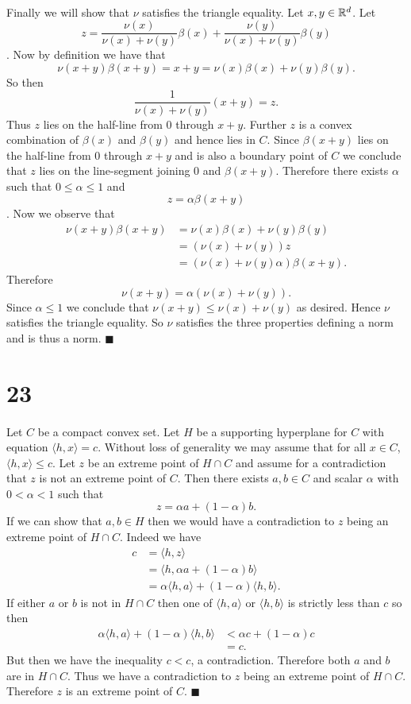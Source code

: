 \documentclass[letterpaper,12pt,oneside,onecolumn]{article}
\begin{document}
\paragraph{}
Finally we will show that $\nu$ satisfies the triangle equality. Let $x,y\in \mathbb{R}^d$. Let $$z = \frac{\nu(x)}{\nu(x)+ \nu(y)} \beta(x) + \frac{\nu(y)}{\nu(x) + \nu(y)} \beta(y)$$. Now by definition we have that
$$\nu(x+y) \beta(x+y) = x+y = \nu(x) \beta(x) + \nu(y) \beta(y).$$
So then $$\frac{1}{\nu(x) + \nu(y)}(x+y) = z.$$
Thus $z$ lies on the half-line from $0$ through $x+y$. Further $z$ is a convex combination of $\beta(x)$ and $\beta(y)$ and hence lies in $C$. Since $\beta(x+y)$ lies on the half-line from $0$ through $x+y$ and is also a boundary point of $C$ we conclude that $z$ lies on the line-segment joining $0$ and $\beta(x+y)$. Therefore there exists $\alpha$ such that $0\leq \alpha\leq 1$ and $$z = \alpha \beta(x+y)$$.
Now we observe that
\begin{align*}
\nu(x+y) \beta(x+y) &= \nu(x) \beta(x) + \nu(y)\beta(y)\\
 &= (\nu(x) + \nu(y))z \\
&= (\nu(x) + \nu(y)\alpha) \beta(x+y).
\end{align*}
Therefore
$$\nu(x+y) = \alpha(\nu(x) + \nu(y)).$$
Since $\alpha \leq 1$ we conclude that $\nu(x+y) \leq \nu(x) + \nu(y)$ as desired. Hence $\nu$ satisfies the triangle equality. So $\nu$ satisfies the three properties defining a norm and is thus a norm. $\blacksquare$
\section*{23}
\paragraph{}
Let $C$ be a compact convex set. Let $H$ be a supporting hyperplane for $C$ with equation $\langle h,x \rangle = c$. Without loss of generality we may assume that for all $x \in C$, $\langle h,x \rangle \leq c$. Let $z$ be an extreme point of $H\cap C$ and assume for a contradiction that $z$ is not an extreme point of $C$. Then there exists $a,b \in C$ and scalar $\alpha$ with $0<\alpha<1$ such that $$z = \alpha a + (1-\alpha)b.$$
If we can show that $a,b \in H$ then we would have a contradiction to $z$ being an extreme point of $H\cap C$. Indeed we have
\begin{align*}
c &= \langle h,z \rangle \\
&= \langle h, \alpha a + (1-\alpha)b \rangle\\
&= \alpha \langle h,a\rangle + (1-\alpha)\langle h,b \rangle.
\end{align*}
If either $a$ or $b$ is not in $H \cap C$ then one of $\langle h,a \rangle$ or $\langle h,b \rangle $ is strictly less than $c$ so then
\begin{align*}
\alpha \langle h,a\rangle + (1-\alpha)\langle h,b \rangle &< \alpha c + (1-\alpha) c\\
&= c.
\end{align*}
But then we have the inequality $c < c$, a contradiction. Therefore both $a$ and $b$ are in $H \cap C$. Thus we have a contradiction to $z$ being an extreme point of $H \cap C$. Therefore $z$ is an extreme point of $C$. $\blacksquare$
\end{document}
